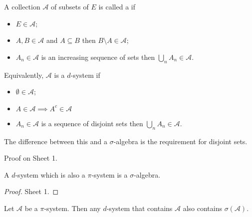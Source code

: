 \begin{definition}[$d$-system] \label{def:d}
	A collection $\mathcal A$ of subsets of $E$ is called a  if
	\begin{itemize}
		\item $E \in \mathcal{A}$;
		\item $A, B \in \mathcal{A}$ and $A \subseteq B$ then $B \setminus A \in \mathcal{A}$;
		\item $A_n \in \mathcal{A}$ is an increasing sequence of sets then $\bigcup_n A_n \in \mathcal{A}$.
	\end{itemize}
\end{definition}

\begin{remark}
	Equivalently, $\mathcal{A}$ is a $d$-system if
	\begin{itemize}
		\item $\emptyset \in \mathcal{A}$;
		\item $A \in \mathcal{A} \implies A^c \in \mathcal{A}$
		\item $A_n \in \mathcal{A}$ is a sequence of disjoint sets then $\bigcup_n A_n \in \mathcal{A}$.
	\end{itemize}
	The difference between this and a $\sigma$-algebra is the requirement for disjoint sets.

	Proof on Sheet 1.
\end{remark}

\begin{proposition}
	A $d$-system which is also a $\pi$-system is a $\sigma$-algebra.
\end{proposition}

\begin{proof}
	Sheet 1.
\end{proof}

\begin{lemma} \label{lem:dyn}
	Let $\mathcal A$ be a $\pi$-system.
	Then any $d$-system that contains $\mathcal A$ also contains $\sigma(\mathcal A)$.
\end{lemma}

